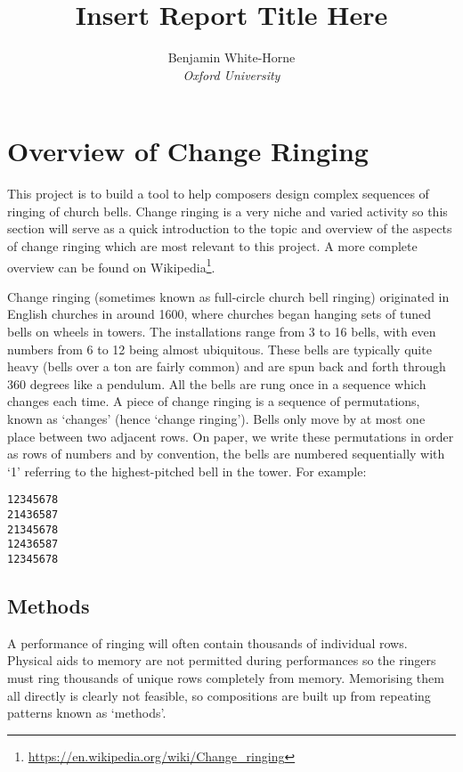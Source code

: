 \documentclass[12pt]{article}
\title{Insert Report Title Here}
\author{Benjamin White-Horne \\ \emph{Oxford University}}
\newcommand{\br}[0]{\vspace{10pt} \noindent}
\begin{document}
\maketitle
\pagebreak

\tableofcontents
\pagebreak

\section{Overview of Change Ringing}

This project is to build a tool to help composers design complex sequences of ringing of church
bells.  Change ringing is a very niche and varied activity so this section will serve as a quick
introduction to the topic and overview of the aspects of change ringing which are most relevant to
this project.  A more complete overview can be found
on Wikipedia\footnote{\url{https://en.wikipedia.org/wiki/Change_ringing}}.

\br{}Change ringing (sometimes known as full-circle church bell ringing) originated in English
churches in around 1600, where churches began hanging sets of tuned bells on wheels in towers.
The installations range from 3 to 16 bells, with even numbers from 6 to 12 being almost ubiquitous.
These bells are typically quite heavy (bells over a ton are fairly common) and are spun
back and forth through 360 degrees like a pendulum.  All the bells are rung once in a sequence which
changes each time.  A piece of change ringing is a sequence of permutations, known as `changes'
(hence `change ringing').  Bells only move by at most one place between two adjacent rows.  On
paper, we write these permutations in order as rows of numbers and by convention, the bells
are numbered sequentially with `1' referring to the highest-pitched bell in the tower.  For
example:

\begin{verbatim}
12345678
21436587
21345678
12436587
12345678
\end{verbatim}

\subsection{Methods}
A performance of ringing will often contain thousands of individual rows.  Physical aids to memory
are not permitted during performances so the ringers must ring thousands of unique rows completely
from memory.  Memorising them all directly is clearly not feasible, so compositions are built up
from repeating patterns known as `methods'.
\end{document}
